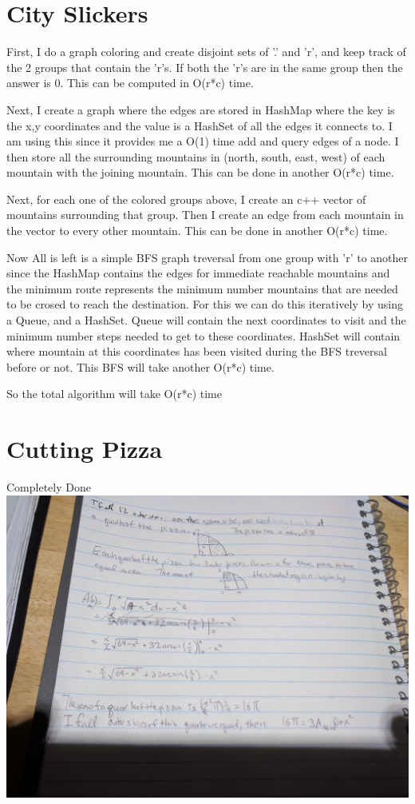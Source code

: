 \documentclass{article}
\begin{document}
\section{City Slickers}
First, I do a graph coloring and create disjoint sets of '.' and 'r', and keep track of the 2 groups that contain the 'r's. If both the 'r's are in the same group then the answer is 0. This can be computed in O(r*c) time.
\par
Next, I create a graph where the edges are stored in HashMap where the key is the x,y coordinates and the value is a HashSet of all the edges it connects to. I am using this since it provides me a O(1) time add and query edges of a node. I then store all the surrounding mountains in (north, south, east, west) of each mountain with the joining mountain. This can be done in another O(r*c) time.
\par
Next, for each one of the colored groups above, I create an c++ vector of mountains surrounding that group. Then I create an edge from each mountain in the vector to every other mountain. This can be done in another O(r*c) time.
\par
Now All is left is a simple BFS graph treversal from one group with 'r' to another since the HashMap contains the edges for immediate reachable mountains and the minimum route represents the minimum number mountains that are needed to be crosed to reach the destination. For this we can do this iteratively by using a Queue, and a HashSet. Queue will contain the next coordinates to visit and the minimum number steps needed to get to these coordinates. HashSet will contain where mountain at this coordinates has been visited during the BFS treversal before or not. This BFS will take another O(r*c) time.
\par
So the total algorithm will take O(r*c) time

\section{Cutting Pizza}
Completely Done
\includegraphics[width=.75\textwidth]{pizza}
\end{document}
